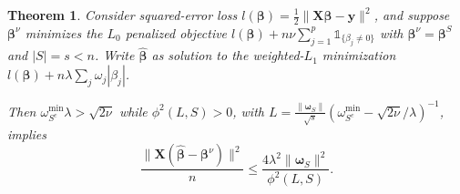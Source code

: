\documentclass[12pt]{article}
\newtheorem{theorem}{\sc Theorem}[section]
\newcommand{\bs}[1]{\boldsymbol{#1}}
\newcommand{\mr}[1]{\mathrm{#1}}
\newcommand{\bm}[1]{\mathbf{#1}}
\newcommand{\ds}[1]{\mathds{#1}}
\begin{document}
\begin{theorem} \label{thm:sparseapprox}  Consider squared-error loss
$l(\bs{\beta}) =
\frac{1}{2}\|\bm{X}\bs{\beta}-\bm{y}\|^2$, and suppose $\bs{\beta}^{\nu}$ minimizes the $L_0$ penalized objective $l(\bs{\beta}) + n\nu\sum_{j=1}^p\ds{1}_{\{\beta_j\neq0\}}$ with $\bs{\beta}^\nu = \bs{\beta}^S$ and $|S|=s<n$.   
Write $\bs{\hat\beta}$ as solution to the weighted-$L_1$ minimization $l(\bs{\beta}) + n\lambda\sum_j\omega_j|\beta_j|$. 

Then  
$\omega^{\mr{min}}_{S^c}\lambda > \sqrt{2\nu}$ while $\phi^2(L,S) > 0$, with 
 $L = \frac{\|\bs{\omega}_S\|}{\sqrt{s}}\left(\omega^{\mr{min}}_{S^c}-\sqrt{2\nu}/\lambda\right)^{-1}$, implies
\begin{equation} \label{sparseineq}
\frac{\|\bm{X}(\bs{\hat\beta}-\bs{\beta}^\nu)\|^2}{n}\leq
\frac{4\lambda^2 \|\bs{\omega}_S\|^2}{\phi^2(L, S)}.
\end{equation} 
\end{theorem}
\end{document}
